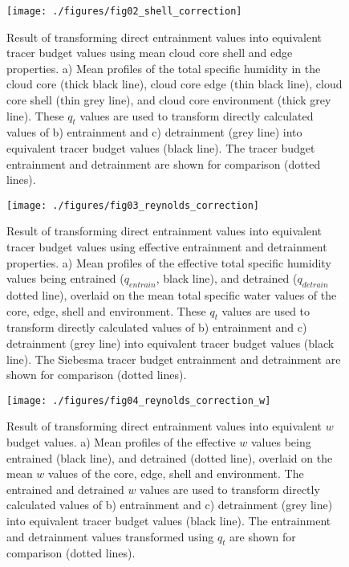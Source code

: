 \documentclass[12pt]{article}
\begin{document}
\begin{figure}[t]
  \noindent
  \texttt{[image: ./figures/fig02\_shell\_correction]}\\
  \caption{Result of transforming direct entrainment values into 
  equivalent tracer budget values using mean cloud core shell and edge 
  properties.  a) Mean profiles of the total specific humidity in the 
  cloud core (thick black line), cloud core edge (thin black line), 
  cloud core shell (thin grey line), and cloud core environment (thick 
  grey line).  These $q_t$ values are used to transform directly 
  calculated values of b) entrainment and c) detrainment (grey line) 
  into equivalent tracer budget values (black line).  The tracer budget 
  entrainment and detrainment are shown for comparison (dotted lines).}
  \label{fig:Shell_correction}
\end{figure}

\begin{figure}[t]
  \noindent
  \texttt{[image: ./figures/fig03\_reynolds\_correction]}\\
  \caption{Result of transforming direct entrainment values into 
  equivalent tracer budget values using effective entrainment and 
  detrainment properties.  a) Mean profiles of the effective total 
  specific humidity values being entrained ($q_{entrain}$, black line), 
  and detrained ($q_{detrain}$ dotted line), overlaid on the mean total 
  specific water values of the core, edge, shell and environment.  These 
  $q_t$ values are used to transform directly calculated values of b) 
  entrainment and c) detrainment (grey line) into equivalent tracer 
  budget values (black line).  The Siebesma tracer budget entrainment 
  and detrainment are shown for comparison (dotted lines).}
  \label{fig:Reynolds_correction}
\end{figure}

\begin{figure}[t]
  \noindent\texttt{[image: ./figures/fig04\_reynolds\_correction\_w]}
  \caption{Result of transforming direct entrainment values into 
  equivalent $w$ budget values.  a) Mean profiles of the effective $w$ 
  values being entrained (black line), and detrained (dotted line), 
  overlaid on the mean $w$ values of the core, edge, shell and 
  environment.  The entrained and detrained $w$ values are used to 
  transform directly calculated values of b) entrainment and c) 
  detrainment (grey line) into equivalent tracer budget values 
  (black line).  The entrainment and detrainment values transformed 
  using $q_t$ are shown for comparison (dotted lines).}
  \label{fig:Reynolds_correction_w}
\end{figure}
\end{document}
